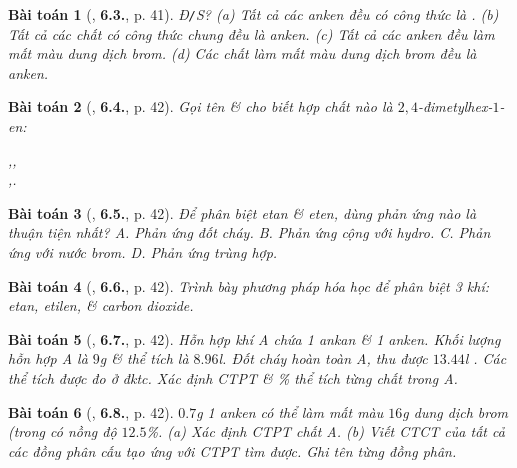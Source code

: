 \documentclass{article}
\numberwithin{equation}{section}
\newtheorem{baitoan}{Bài toán}[section]
\begin{document}
\begin{baitoan}[\cite{SBT_Hoa_Hoc_11_co_ban}, \textbf{6.3.}, p. 41]
	\emph{Đ\texttt{/}S?} (a) Tất cả các anken đều có công thức là \emph{}. (b) Tất cả các chất có công thức chung \emph{} đều là anken. (c) Tất cả các anken đều làm mất màu dung dịch brom. (d) Các chất làm mất màu dung dịch brom đều là anken.
\end{baitoan}

\begin{baitoan}[\cite{SBT_Hoa_Hoc_11_co_ban}, \textbf{6.4.}, p. 42]
	Gọi tên \& cho biết hợp chất nào là $2,4$-đimetylhex-$1$-en:
	\begin{center}
		,\hspace{1cm},\\\vspace{5mm},\hspace{1cm}.
	\end{center}
\end{baitoan}

\begin{baitoan}[\cite{SBT_Hoa_Hoc_11_co_ban}, \textbf{6.5.}, p. 42]
	Để phân biệt etan \& eten, dùng phản ứng nào là thuận tiện nhất? {\sf A.} Phản ứng đốt cháy. {\sf B.} Phản ứng cộng với hydro. {\sf C.} Phản ứng với nước brom. {\sf D.} Phản ứng trùng hợp.
\end{baitoan}

\begin{baitoan}[\cite{SBT_Hoa_Hoc_11_co_ban}, \textbf{6.6.}, p. 42]
	Trình bày phương pháp hóa học để phân biệt 3 khí: etan, etilen, \& carbon dioxide.
\end{baitoan}

\begin{baitoan}[\cite{SBT_Hoa_Hoc_11_co_ban}, \textbf{6.7.}, p. 42]
	Hỗn hợp khí A chứa 1 ankan \& 1 anken. Khối lượng hỗn hợp A là $9$\emph{g} \& thể tích là $8.96$\emph{l}. Đốt cháy hoàn toàn A, thu được $13.44$\emph{l} \emph{}. Các thể tích được đo ở đktc. Xác định CTPT \& \% thể tích từng chất trong A.
\end{baitoan}

\begin{baitoan}[\cite{SBT_Hoa_Hoc_11_co_ban}, \textbf{6.8.}, p. 42]
	$0.7$\emph{g} 1 anken có thể làm mất màu $16$\emph{g} dung dịch brom (trong \emph{} có nồng độ $12.5$\%. (a) Xác định CTPT chất A. (b) Viết CTCT của tất cả các đồng phân cấu tạo ứng với CTPT tìm được. Ghi tên từng đồng phân.
\end{baitoan}
\end{document}
